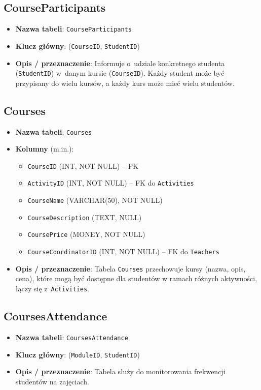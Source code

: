 \documentclass[12pt]{article}
\begin{document}
\subsection{CourseParticipants}
\begin{itemize}
    \item \textbf{Nazwa tabeli}: \texttt{CourseParticipants}
    \item \textbf{Klucz główny}: (\texttt{CourseID}, \texttt{StudentID})  
    \item \textbf{Opis / przeznaczenie}:  
          Informuje o~udziale konkretnego studenta (\texttt{StudentID}) w~danym kursie (\texttt{CourseID}). Każdy student może być przypisany do wielu kursów, a każdy kurs może mieć wielu studentów.
\end{itemize}

\newpage

\subsection{Courses}
\begin{itemize}
    \item \textbf{Nazwa tabeli}: \texttt{Courses}
    \item \textbf{Kolumny} (m.in.):
          \begin{itemize}
            \item \texttt{CourseID} (INT, NOT NULL) -- PK
            \item \texttt{ActivityID} (INT, NOT NULL) -- FK do \texttt{Activities}
            \item \texttt{CourseName} (VARCHAR(50), NOT NULL)
            \item \texttt{CourseDescription} (TEXT, NULL)
            \item \texttt{CoursePrice} (MONEY, NOT NULL)
            \item \texttt{CourseCoordinatorID} (INT, NOT NULL) -- FK do \texttt{Teachers}
          \end{itemize}
    \item \textbf{Opis / przeznaczenie}:  
          Tabela \texttt{Courses} przechowuje kursy (nazwa, opis, cena), które mogą być dostępne dla studentów w ramach różnych aktywności, łączy się z~\texttt{Activities}.
\end{itemize}

\subsection{CoursesAttendance}
\begin{itemize}
    \item \textbf{Nazwa tabeli}: \texttt{CoursesAttendance}
    \item \textbf{Klucz główny}: (\texttt{ModuleID}, \texttt{StudentID})
    \item \textbf{Opis / przeznaczenie}:  
          Tabela służy do monitorowania frekwencji studentów na zajęciach.
\end{itemize}
\end{document}

